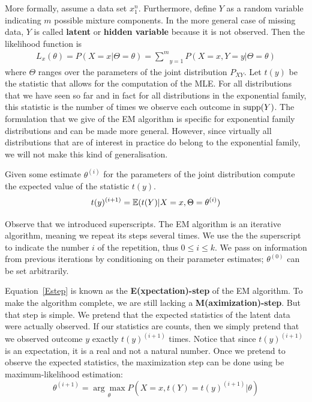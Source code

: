 More formally, assume a data set $ x_{1}^{n} $. Furthermore, define $ Y $ as a random variable indicating $ m $ possible
mixture components. In the more general case of missing data, $ Y $ is called \textbf{latent} or \textbf{hidden variable}
because it is not observed. Then the likelihood function is 
\begin{align}
L_{x}(\theta) = P(X=x|\Theta=\theta) = \underset{y=1}{\overset{m}{\sum}} P(X=x, Y=y|\Theta=\theta)
\end{align}
where $ \Theta $ ranges over the parameters of the joint distribution $ P_{XY} $. Let $ t(y) $ be the
statistic that allows for the computation of the MLE. For all distributions that we have seen so far and in fact for all
distributions in the exponential family, this statistic is the number of times we observe each outcome 
in $ \operatorname{supp}(Y) $. The formulation
that we give of the EM algorithm is specific for exponential family distributions and can be made more general. However, since virtually
all distributions that are of interest in practice do belong to the exponential family, we will not make this kind of generalisation.

Given some estimate $\theta^{(i)} $ for the parameters of the joint
distribution compute the expected value of the statistic $ t(y) $.
\begin{equation} \label{Estep}
t(y)^{(i+1)} = \mathbb{E}(t(Y)|X = x,\Theta = \theta^{(i)})
\end{equation} 

Observe that we introduced superscripts. The EM algorithm is an iterative algorithm, meaning we repeat its steps several
times. We use the the superscript to indicate the number $i$ of the repetition, thus $ 0 \leq i \leq k $. We pass on
information from previous iterations by conditioning on their parameter estimates; $\theta^{(0)}$ can be set arbitrarily.

Equation~\eqref{Estep} is known as the \textbf{E(xpectation)-step} of the EM algorithm. To make the algorithm complete, we are still lacking a
\textbf{M(aximization)-step}. But that step is simple. We pretend that the expected statistics of the latent data were actually observed. If
our statistics are counts, then we simply pretend that we observed outcome $ y $ exactly $ t(y)^{(i+1)} $ times. Notice that since $ t(y)^{(i+1)} $
is an expectation, it is a real and not a natural number. Once we pretend to observe the expected statistics, the maximization step can be done
using be maximum-likelihood estimation:
\begin{equation} \label{Mstep}
\theta^{(i+1)} = \underset{\theta}{\arg\max} P(X=x, t(Y) = t(y)^{(i+1)}|\theta)
\end{equation}

